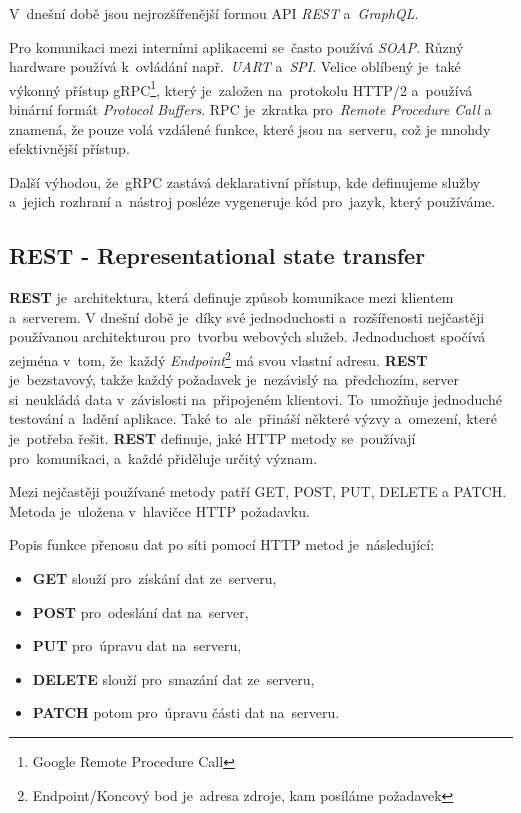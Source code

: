 \documentclass[14pt,a4paper]{article}
\begin{document}
        V~dnešní době jsou nejrozšířenější formou API \emph{REST} a~\emph{GraphQL}.

        Pro komunikaci mezi interními aplikacemi se~často používá \emph{SOAP}. Různý hardware používá k~ovládání např.~\emph{UART} a~\emph{SPI}.
        Velice oblíbený je~také výkonný přístup gRPC\footnote{Google Remote Procedure Call}, který je~založen na~protokolu HTTP/2 a~používá binární formát \emph{Protocol Buffers}.
        RPC je~zkratka pro~\emph{Remote Procedure Call} a znamená, že pouze volá vzdálené funkce, které jsou na~serveru,
        což je mnohdy efektivnější přístup.
        
        Další výhodou, že~gRPC zastává deklarativní přístup, kde definujeme služby a~jejich rozhraní a~nástroj posléze vygeneruje kód pro~jazyk, který používáme.

        \subsection{REST - Representational state transfer}
        \textbf{REST} je~architektura, která definuje způsob komunikace mezi klientem a~serverem.
        V dnešní době je~díky své jednoduchosti a~rozšířenosti nejčastěji používanou architekturou pro~tvorbu webových služeb.
        Jednoduchost spočívá zejména v~tom, že~každý \emph{Endpoint}\footnote{Endpoint/Koncový bod je~adresa zdroje, kam posíláme požadavek}
        má svou vlastní adresu.
        \textbf{REST} je~bezstavový, takže každý požadavek je~nezávislý na~předchozím, server si~neukládá data v~závislosti na~připojeném klientovi.
        To~umožňuje jednoduché testování a~ladění aplikace. Také to~ale~přináší některé výzvy a~omezení, které je~potřeba řešit.
        \textbf{REST} definuje, jaké HTTP metody se~používají pro~komunikaci, a~každé přiděluje určitý význam.
    
        Mezi nejčastěji používané metody patří GET, POST, PUT, DELETE a PATCH. Metoda je~uložena v~hlavičce HTTP požadavku.

        Popis funkce přenosu dat po síti pomocí HTTP metod je~následující:
        \begin{itemize}
            \item \textbf{GET} slouží pro~získání dat ze~serveru,
            \item \textbf{POST} pro~odeslání dat na~server,
            \item \textbf{PUT} pro~úpravu dat na~serveru,
            \item \textbf{DELETE} slouží pro~smazání dat ze~serveru,
            \item \textbf{PATCH} potom pro~úpravu části dat na~serveru.
        \end{itemize}
\end{document}
